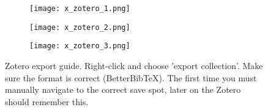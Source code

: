 


\begin{figure}[h!]%
    \centering
    \begin{subfigure}{.33\textwidth}
        \texttt{[image: x\_zotero\_1.png]}
    \end{subfigure}\quad
    \begin{subfigure}{.33\textwidth}
        \texttt{[image: x\_zotero\_2.png]}
    \end{subfigure}\quad
    \begin{subfigure}{.33\textwidth}
        \texttt{[image: x\_zotero\_3.png]}
    \end{subfigure}
    \caption{Zotero export guide. Right-click and choose 'export collection'. Make sure the format is correct (BetterBibTeX). The first time you must manually navigate to the correct save spot, later on the Zotero should remember this.}
    \label{fig:zotero_figure}
\end{figure}
